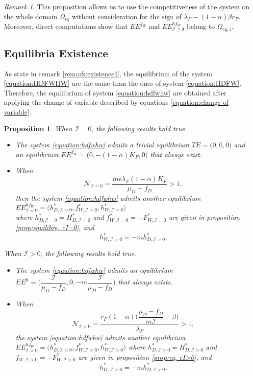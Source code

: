 \documentclass{article}
\newcommand{\lfw}{\lambda_{F}}
\newcommand{\lfw}{\lambda_{F}}
\newcommand{\cI}{\mathcal{I}}
\newtheorem{prop}[theorem]{Proposition}
\theoremstyle{definition}
\theoremstyle{remark}
\newtheorem{remark}[theorem]{Remark}
\begin{document}
\begin{remark} \label{remark:competitivity}
This proposition allows us to use the competitiveness of the system on the whole domain $\Omega_{eq}$ without consideration for the sign of $\lfw - (1-\alpha)\beta r_F$. Moreover, direct computations show that $EE^{f_W}$ and $EE^{hf_W}_{\cI \geq 0}$ belong to $\Omega_{eq, 1}$.
\end{remark}

\subsection{Equilibria Existence}
As state in remark \ref{remark:existence1}, the equilibrium of the system \eqref{equation:HDFWHW} are the same than the ones of system \eqref{equation:HDFW}. Therefore, the equilibrium of system \eqref{equation:hdfwhw} are obtained after applying the change of variable described by equations \eqref{equation:change of variable}.

\begin{prop}
When $\cI = 0$, the following results hold true.
\begin{itemize}
\item The system \eqref{equation:hdfwhw} admits a trivial equilibrium $TE = \Big(0,0, 0\Big)$ and an equilibrium $EE^{f_W} = \Big(0, -(1-\alpha)K_F,0 \Big)$ that always exist.

\item When
$$
\mathcal{N}_{\cI = 0} = \dfrac{m e \lfw (1-\alpha)K_F}{\mu_D - f_D} > 1,
$$ 
then the system \eqref{equation:hdfwhw} admits another equilibrium $EE^{hf_W}_{\cI = 0} = \Big(h^*_{D, \cI = 0}, f^*_{W, \cI = 0}, h^*_{W, \cI = 0}\Big)$ \\ 
where $h^*_{D, \cI = 0} = H^*_{D, \cI = 0}$ and $f^*_{W, \cI = 0} = -F^*_{W, \cI = 0}$ are given in proposition \ref{prop:equilibre, cI=0}, and
$$ 
h^*_{W, \cI = 0} = -m h^*_{D, \cI = 0}.
$$
\end{itemize}

When $\cI > 0$, the following results hold true.
\begin{itemize}
\item The system \eqref{equation:hdfwhw} admits an equilibrium $EE^{h} = \Big(\dfrac{\cI}{\mu_D - f_D}, 0, -m\dfrac{\cI}{\mu_D - f_D} \Big)$ that always exists.
\item When 
$$ \mathcal{N}_{\cI >0} =\dfrac{r_F(1-\alpha)\Big({\dfrac{\mu_D - f_D}{m\cI}+\beta\Big)}}{\lfw}  > 1,$$
the system \eqref{equation:hdfwhw} admits another equilibrium $EE^{hf_W}_{\cI > 0} = \Big(h^*_{D, \cI > 0}, f^*_{W, \cI > 0}, h^*_{W, \cI > 0}\Big)$
where $h^*_{D, \cI > 0} = H^*_{D, \cI > 0}$ and $f_{W, \cI > 0} = - F^*_{W, \cI > 0}$ are given in proposition \ref{prop:eq, cI>0}, and
$$ 
h^*_{W, \cI > 0} = -m h^*_{D, \cI > 0}.
$$
\end{itemize} 
\end{prop}  
\end{document}
